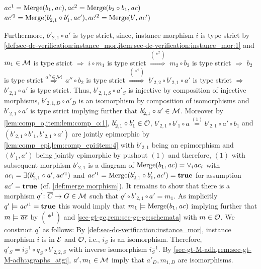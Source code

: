 \begin{description}
\begin{description}
\begin{center}
$ac^1=\mathrm{Merge}(b_1,\mathit{ac}),ac^2=\mathrm{Merge}(b_2 \circ b_1,\mathit{ac})$
$ac'^1=\mathrm{Merge}(b'_{2,1} \circ b'_1,\mathit{ac}'),ac'^2=\mathrm{Merge}(b',\mathit{ac}')$
\end{center}
Furthermore, $b'_{2,1} \circ a'$ is type strict, since, instance morphism $i$ is type strict by \cref{def:sec-dc-verification:instance_mor,item:sec-dc-verification:instance_mor:1} and $m_1 \in {\cal M}$ is type strict $\Rightarrow$ $i \circ m_1$ is type strict $\stackrel{(*^2)}{\Rightarrow}$ $m_2 \circ b_2$ is type strict $\Rightarrow$ $b_2$ is type strict $\stackrel{a'' \in {\cal M}}{\Rightarrow}$ $a'' \circ b_2$ is type strict $\stackrel{(*^4)}{\Rightarrow}$ $b'_{2,2} \circ b'_{2,1} \circ a'$ is type strict $\Rightarrow$ $b'_{2,1} \circ a'$ is type strict.\thispagestyle{plain}
Thus, $b'_{2,1,S} \circ a'_S$ is injective by composition of injective morphisms, $b'_{2,1,D} \circ a'_D$ is an isomorphism by composition of isomorphisms and $b'_{2,1} \circ a'$ is type strict implying further that $b'_{2,1} \circ a' \in {\cal M}$.
Moreover by \cref{lem:comp_o,item:lem:comp_o:1}, $b'_{2,1} \circ b'_1 \in {\cal O}$, $b'_{2,1} \circ b'_1 \circ a \stackrel{(1)}{=} b'_{2,1} \circ a' \circ b_1$ and $(b'_{2,1} \circ b'_1,b'_{2,1} \circ a')$ are jointly epimorphic by \cref{lem:comp_epi,lem:comp_epi:item:4} with $b'_{2,1}$ being an epimorphism and $(b'_1,a')$ being jointly epimorphic by pushout $(1)$ and therefore, $(1)$ with subsequent morphism $b'_{2,1}$ is a diagram of $\mathrm{Merge}(b_1, \mathit{ac})=\vee_{i}\mathit{ac}_i$ with $\mathit{ac}_i=\exists(b'_{2,1} \circ a', \mathit{ac}'^1)$ and $\mathit{ac}'^1=\mathrm{Merge}(b'_{2,1} \circ b'_1,\mathit{ac}')=\textbf{true}$ for assumption $\mathit{ac}'=\textbf{true}$ (cf. \cref{def:merge morphism}).
It remains to show that there is a morphism $q'\colon \overline{C} \to G \in {\cal M}$ such that $q' \circ b'_{2,1} \circ a'=m_1$.
As implicitly $q' \models \mathit{ac}'^1=\textbf{true}$ this would imply that $m_1 \models \mathrm{Merge}(b_1,\mathit{ac})$ implying further that $m \models \overline{\mathit{ac}}$ by $(*^1)$ and \cref{sec-gt-gc,rem:sec-gc-gc:schemata} with $m \in {\cal O}$.
We construct $q'$ as follows: By \cref{def:sec-dc-verification:instance_mor}, instance morphism $i$ is in $\mathcal{E}$ and ${\cal O}$, i.e., $i_S$ is an isomorphism.
Therefore, $q'_S=i^{-1}_S \circ q_S \circ b'_{2,2,S}$ with inverse isomorphism $i^{-1}_S$.
By \cref{sec-gt-M-adh,rem:sec-gt-M-adh:agraphs_atgi}, $a',m_1 \in {\cal M}$ imply that $a'_D,m_{1,D}$ are isomorphisms.

\end{description}
\end{description}

